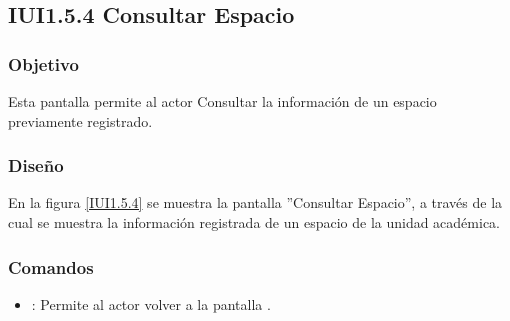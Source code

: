\subsection{IUI1.5.4 Consultar Espacio}

\subsubsection{Objetivo}
	Esta pantalla permite al actor Consultar la información de un espacio previamente registrado.

\subsubsection{Diseño}

	En la figura \ref{IUI1.5.4} se muestra la pantalla ''Consultar Espacio'', a través de la cual se muestra la información registrada de un espacio de la unidad académica.


\subsubsection{Comandos}
\begin{itemize}
	
	\item {}: Permite al actor volver a la pantalla .
\end{itemize}
